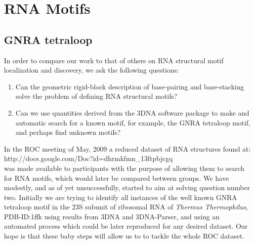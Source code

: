 \chapter{RNA Motifs}
\label{motifs} 


\section{GNRA tetraloop}
In order to compare our work to that of others on RNA structural motif
localization and discovery, we ask the following questions:
\begin{enumerate}
\item{Can  the geometric rigid-block  description of  base-pairing and
  base-stacking solve the problem of defining RNA structural motifs?}
\item{Can we use quantities derived  from the 3DNA software package to
  make and automatic  search for a known motif,  for example, the GNRA
  tetraloop motif, and perhaps find unknown motifs?}
\end{enumerate}
In the  ROC meeting of May,  2009 a reduced dataset  of RNA structures
found  at:\\  http://docs.google.com/Doc?id=dhrmkfmn\_13ftpbjcgq\\ was
made available  to participants with  the purpose of allowing  them to
search for RNA motifs, which would later be compared between groups.
We  have modestly, and  as of  yet unsuccessfully,  started to  aim at
solving question number  two. Initially we are trying  to identify all
instances of the well known GNRA tetraloop motif in the 23S subunit of
ribosomal  RNA  of  \textit{Thermus Thermophilus},  PDB-ID:1ffk  using
results  from 3DNA  and 3DNA-Parser,  and using  an  automated process
which could be later reproduced  for any desired dataset.  Our hope is
that  these baby  steps  will allow  us  to to  tackle  the whole  ROC
dataset.


